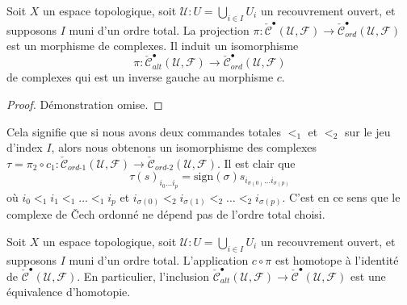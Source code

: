 \begin{lemma}

\label{lemma-project-to-ordered}
Soit $X$ un espace topologique, soit $\mathcal{U} : U = \bigcup_{i \in I} U_i$ un recouvrement ouvert, et supposons $I$ muni d'un ordre total. La projection $\pi : \check{\mathcal{C}}^\bullet(\mathcal{U}, \mathcal{F})
\to \check{\mathcal{C}}_{ord}^\bullet(\mathcal{U}, \mathcal{F})$ est un morphisme de complexes. Il induit un isomorphisme $$
\pi : \check{\mathcal{C}}_{alt}^\bullet(\mathcal{U}, \mathcal{F})
\to \check{\mathcal{C}}_{ord}^\bullet(\mathcal{U}, \mathcal{F})
$$ de complexes qui est un inverse gauche au morphisme $c$.
\end{lemma}

\begin{proof}
Démonstration omise.
\end{proof}

\begin{remark}

\label{remark-compared-ordered-complexes}
Cela signifie que si nous avons deux commandes totales $<_1$ et $<_2$ sur le jeu d'index $I$, alors nous obtenons un isomorphisme des complexes $\tau = \pi_2 \circ c_1 :
\check{\mathcal{C}}_{ord\text{-}1}(\mathcal{U}, \mathcal{F}) \to
\check{\mathcal{C}}_{ord\text{-}2}(\mathcal{U}, \mathcal{F})$. Il est clair que $$
\tau(s)_{i_0 \ldots i_p} =
\text{sign}(\sigma) s_{i_{\sigma(0)} \ldots i_{\sigma(p)}}
$$ où $i_0 <_1 i_1 <_1 \ldots <_1 i_p$ et $i_{\sigma(0)} <_2 i_{\sigma(1)} <_2 \ldots <_2 i_{\sigma(p)}$. C'est en ce sens que le complexe de {\v C}ech ordonné ne dépend pas de l'ordre total choisi.
\end{remark}

\begin{lemma}

\label{lemma-alternating-usual}
Soit $X$ un espace topologique, soit $\mathcal{U} : U = \bigcup_{i \in I} U_i$ un recouvrement ouvert, et supposons $I$ muni d'un ordre total. L'application $c \circ \pi$ est homotope à l'identité de $\check{\mathcal{C}}^\bullet(\mathcal{U}, \mathcal{F})$. En particulier, l'inclusion $\check{\mathcal{C}}_{alt}^\bullet(\mathcal{U}, \mathcal{F}) \to
\check{\mathcal{C}}^\bullet(\mathcal{U}, \mathcal{F})$ est une équivalence d'homotopie.
\end{lemma}

